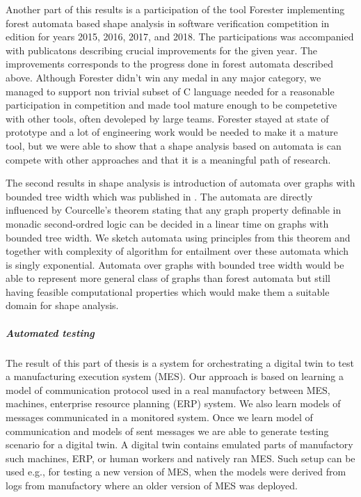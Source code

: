 Another part of this results is a participation of the tool Forester
implementing forest automata based shape analysis
in software verification competition in edition for years 2015, 2016, 2017, and 2018.
The participations was accompanied with publicatons \cite{svcomp16-forester,holik_run_2016,holik_forester_2017}
describing crucial improvements for the given year.
The improvements corresponds to the progress done in forest automata described above.
Although Forester didn't win any medal in any major category,
we managed to support non trivial subset of C language needed for a reasonable
participation in competition and made tool mature enough to be competetive with
other tools, often devoleped by large teams.
Forester stayed at state of prototype and a lot of engineering work would be needed to make
it a mature tool, but we were able to show that a shape analysis based on automata is
can compete with other approaches and that it is a meaningful path of research.


The second results in shape analysis is introduction of automata over graphs
with bounded tree width which was published in \cite{netys21}.
The automata are directly influenced by Courcelle's theorem \cite{courcell_graph_2012}
stating that any graph property definable in monadic second-ordred logic can be decided
in a linear time on graphs with bounded tree width.
We sketch automata using principles from this theorem and together with complexity
of algorithm for entailment over these automata which is singly exponential.
Automata over graphs with bounded tree width would be able to represent
more general class of graphs than forest automata but still having feasible computational
properties which would make them a suitable domain for shape analysis.

\subparagraph{Automated testing}
The result of this part of thesis is a system for orchestrating a digital twin to
test a manufacturing execution system (MES).
Our approach is based on learning a model of communication protocol used in a real manufactory between
MES, machines, enterprise resource planning (ERP) system.
We also learn models of messages communicated in a monitored system.
Once we learn model of communication and models of sent messages we are able
to generate testing scenario for a digital twin.
A digital twin contains emulated parts of manufactory such machines, ERP, or human workers and
natively ran MES.
Such setup can be used e.g., for testing a new version of MES, when the models were derived
from logs from manufactory where an older version of MES was deployed.

